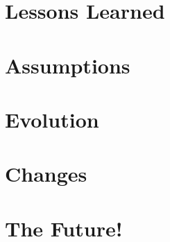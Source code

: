 \documentclass[aspectratio=169]{beamer}
\begin{document}
\section{Lessons Learned}

\section{Assumptions}

\section{Evolution}

\section{Changes}

\section{The Future!}

\end{document}
